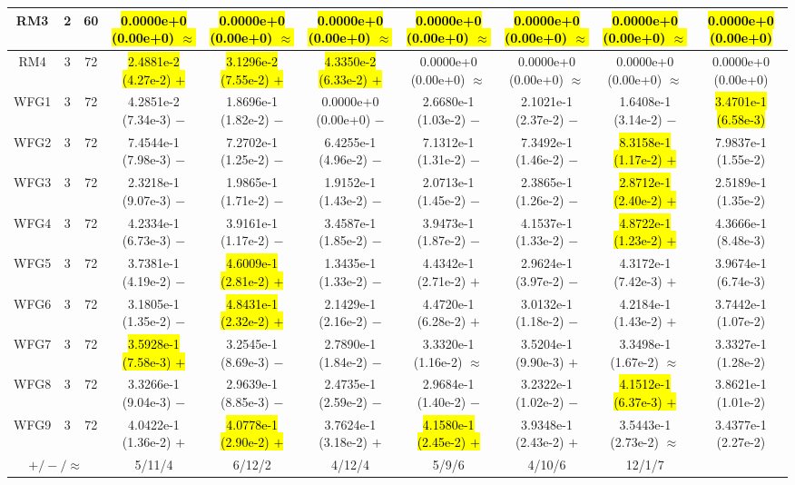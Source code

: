 \documentclass[journal]{IEEEtran}
\begin{document}
\begin{table*}[htbp]
\begin{tabular}{cccccccccc}
\hline
\multirow{1}{*}{RM3}&2&60&\hl{0.0000e+0 (0.00e+0) $\approx$}&\hl{0.0000e+0 (0.00e+0) $\approx$}&\hl{0.0000e+0 (0.00e+0) $\approx$}&\hl{0.0000e+0 (0.00e+0) $\approx$}&\hl{0.0000e+0 (0.00e+0) $\approx$}&\hl{0.0000e+0 (0.00e+0) $\approx$}&\hl{0.0000e+0 (0.00e+0)}\\
\hline
\multirow{1}{*}{RM4}&3&72&\hl{2.4881e-2 (4.27e-2) $+$}&\hl{3.1296e-2 (7.55e-2) $+$}&\hl{4.3350e-2 (6.33e-2) $+$}&0.0000e+0 (0.00e+0) $\approx$&0.0000e+0 (0.00e+0) $\approx$&0.0000e+0 (0.00e+0) $\approx$&0.0000e+0 (0.00e+0)\\
\hline
\multirow{1}{*}{WFG1}&3&72&4.2851e-2 (7.34e-3) $-$&1.8696e-1 (1.82e-2) $-$&0.0000e+0 (0.00e+0) $-$&2.6680e-1 (1.03e-2) $-$&2.1021e-1 (2.37e-2) $-$&1.6408e-1 (3.14e-2) $-$&\hl{3.4701e-1 (6.58e-3)}\\
\hline
\multirow{1}{*}{WFG2}&3&72&7.4544e-1 (7.98e-3) $-$&7.2702e-1 (1.25e-2) $-$&6.4255e-1 (4.96e-2) $-$&7.1312e-1 (1.31e-2) $-$&7.3492e-1 (1.46e-2) $-$&\hl{8.3158e-1 (1.17e-2) $+$}&7.9837e-1 (1.55e-2)\\
\hline
\multirow{1}{*}{WFG3}&3&72&2.3218e-1 (9.07e-3) $-$&1.9865e-1 (1.71e-2) $-$&1.9152e-1 (1.43e-2) $-$&2.0713e-1 (1.45e-2) $-$&2.3865e-1 (1.26e-2) $-$&\hl{2.8712e-1 (2.40e-2) $+$}&2.5189e-1 (1.35e-2)\\
\hline
\multirow{1}{*}{WFG4}&3&72&4.2334e-1 (6.73e-3) $-$&3.9161e-1 (1.17e-2) $-$&3.4587e-1 (1.85e-2) $-$&3.9473e-1 (1.87e-2) $-$&4.1537e-1 (1.33e-2) $-$&\hl{4.8722e-1 (1.23e-2) $+$}&4.3666e-1 (8.48e-3)\\
\hline
\multirow{1}{*}{WFG5}&3&72&3.7381e-1 (4.19e-2) $-$&\hl{4.6009e-1 (2.81e-2) $+$}&1.3435e-1 (1.33e-2) $-$&4.4342e-1 (2.71e-2) $+$&2.9624e-1 (3.97e-2) $-$&4.3172e-1 (7.42e-3) $+$&3.9674e-1 (6.74e-3)\\
\hline
\multirow{1}{*}{WFG6}&3&72&3.1805e-1 (1.35e-2) $-$&\hl{4.8431e-1 (2.32e-2) $+$}&2.1429e-1 (2.16e-2) $-$&4.4720e-1 (6.28e-2) $+$&3.0132e-1 (1.18e-2) $-$&4.2184e-1 (1.43e-2) $+$&3.7442e-1 (1.07e-2)\\
\hline
\multirow{1}{*}{WFG7}&3&72&\hl{3.5928e-1 (7.58e-3) $+$}&3.2545e-1 (8.69e-3) $-$&2.7890e-1 (1.84e-2) $-$&3.3320e-1 (1.16e-2) $\approx$&3.5204e-1 (9.90e-3) $+$&3.3498e-1 (1.67e-2) $\approx$&3.3327e-1 (1.28e-2)\\
\hline
\multirow{1}{*}{WFG8}&3&72&3.3266e-1 (9.04e-3) $-$&2.9639e-1 (8.85e-3) $-$&2.4735e-1 (2.59e-2) $-$&2.9684e-1 (1.40e-2) $-$&3.2322e-1 (1.02e-2) $-$&\hl{4.1512e-1 (6.37e-3) $+$}&3.8621e-1 (1.01e-2)\\
\hline
\multirow{1}{*}{WFG9}&3&72&4.0422e-1 (1.36e-2) $+$&\hl{4.0778e-1 (2.90e-2) $+$}&3.7624e-1 (3.18e-2) $+$&\hl{4.1580e-1 (2.45e-2) $+$}&3.9348e-1 (2.43e-2) $+$&3.5443e-1 (2.73e-2) $\approx$&3.4377e-1 (2.27e-2)\\
\hline
\multicolumn{3}{c}{$+/-/\approx$}&5/11/4&6/12/2&4/12/4&5/9/6&4/10/6&12/1/7&\\
\bottomrule
\end{tabular}
\label{No Label}
\end{table*}
\end{document}
